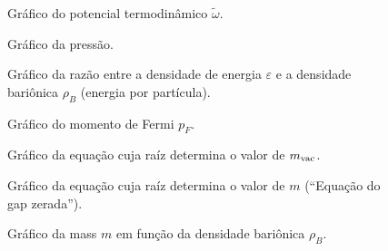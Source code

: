 \begin{figure}
	
	\caption{Gráfico do potencial termodinâmico $\tilde{\omega}$. \protect}
	\label{Fig:thermodynamic_potential_NJL-Buballa_Set_1}
\end{figure}

\begin{figure}
	
	\caption{Gráfico da pressão. \protect}
	\label{Fig:pressure_NJL-Buballa_Set_1}
\end{figure}

\begin{figure}
	
	\caption{Gráfico da razão entre a densidade de energia $\varepsilon$ e a densidade bariônica $\rho_B$ (energia por partícula). \protect}
	\label{Fig:energy_density_per_particle_NJL-Buballa_Set_1}
\end{figure}

\FloatBarrier


\begin{figure}
	
	\caption{Gráfico do momento de Fermi $p_F$. \protect}
	\label{Fig:fermi_momentum_NJL-D_1}
\end{figure}

\begin{figure}
	
	\caption{Gráfico da equação cuja raíz determina o valor de $m_{\rm{vac}}$. \protect}
	\label{Fig:vacuum_mass_equation_NJL-D_1}
\end{figure}

\begin{figure}
	
	\caption{Gráfico da equação cuja raíz determina o valor de $m$ (``Equação do gap zerada''). \protect}
	\label{Fig:gap_NJL-D_1}
\end{figure}

\begin{figure}
	
	\caption{Gráfico da mass $m$ em função da densidade bariônica $\rho_B$. \protect}
	\label{Fig:mass_NJL-D_1}
\end{figure}


